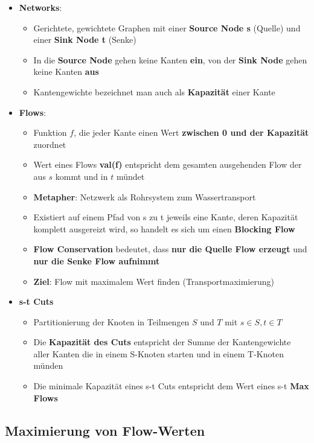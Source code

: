 \documentclass[10pt,a4paper]{article}
\begin{document}
	\begin{itemize}
		\item \textbf{Networks}:
		\begin{itemize}
			\item Gerichtete, gewichtete Graphen mit einer \textbf{Source Node s} (Quelle) und einer \textbf{Sink Node t} (Senke)
			\item In die \textbf{Source Node} gehen keine Kanten \textbf{ein}, von der \textbf{Sink Node} gehen keine Kanten \textbf{aus}
			\item Kantengewichte bezeichnet man auch als \textbf{Kapazität} einer Kante
		\end{itemize}
		\item \textbf{Flows}:
		\begin{itemize}
			\item Funktion $f$, die jeder Kante einen Wert \textbf{zwischen 0 und der Kapazität} zuordnet
			\item Wert eines Flows \textbf{val(f)} entspricht dem gesamten ausgehenden Flow der aus $s$ kommt und in $t$ mündet
			\item \textbf{Metapher}: Netzwerk als Rohrsystem zum Wassertransport
			\item Existiert auf einem Pfad von s zu t jeweils eine Kante, deren Kapazität komplett ausgereizt wird, so handelt es sich um einen \textbf{Blocking Flow}
			\item \textbf{Flow Conservation} bedeutet, dass \textbf{nur die Quelle Flow erzeugt} und \textbf{nur die Senke Flow aufnimmt}
			\item \textbf{Ziel}: Flow mit maximalem Wert finden (Transportmaximierung)
		\end{itemize}
		\item \textbf{s-t Cuts}
		\begin{itemize}
			\item Partitionierung der Knoten in Teilmengen $S$ und $T$ mit $s \in S, t \in T$
			\item Die \textbf{Kapazität des Cuts} entspricht der Summe der Kantengewichte aller Kanten die in einem S-Knoten starten und in einem T-Knoten münden
			\item Die minimale Kapazität eines s-t Cuts entspricht dem Wert eines s-t \textbf{Max Flows}
		\end{itemize}
	\end{itemize}

	\subsection{Maximierung von Flow-Werten}
	\label{mfm:sub:maximierung_von_flow_werten}
	
\end{document}
